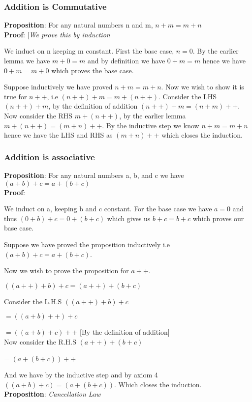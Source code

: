 \documentclass[10pt]{article}
\begin{document}
\subsubsection*{Addition is Commutative}
\textbf{Proposition}: For any natural numbers n and m, $ n + m = m + n $
\\[3pt]
\textbf{Proof}: [\emph{We prove this by induction}

  We induct on n keeping m constant. First the base case, $n = 0$. By the
  earlier lemma we have $m + 0 = m$ and by definition we have $0 + m =m$ hence
  we have $0 + m = m + 0$ which proves the base case.

  Suppose inductively we have proved $ n + m = m + n $. Now we wish to show it
  is true for $n++$, i.e $(n++) + m = m + (n++)$. Consider the LHS $(n++) + m$,
  by the definition of addition $(n++) + m = (n + m)++$. Now consider the RHS
  $m + (n++)$, by the earlier lemma $m + (n++) = (m + n)++$. By the inductive
  step we know $ n + m = m + n$ hence we have the LHS and RHS as $(m + n)++$
  which closes the induction.


\subsubsection*{Addition is associative}
\textbf{Proposition}: For any natural numbers a, b, and c we have $(a + b) + c =
a + (b + c)$
\\[3pt]
\textbf{Proof}:

We induct on a, keeping b and c constant. For the base case we have $a = 0$ and
thus $(0 + b) + c = 0 + (b + c)$ which gives us $b + c = b + c$ which proves our
base case.

Suppose we have proved the proposition inductively i.e $(a+b)+c = a+(b+c)$.

Now we wish to prove the proposition for $a++$.

$((a++)+b)+c = (a++) + (b + c)$

Consider the L.H.S $((a++)+b)+c$

$= ((a+b)++)+c$

$= ((a+b)+c)++$   [By the definition of addition]
\\[3pt]
Now consider the R.H.S $(a++)+(b+c)$

= $(a+(b+c))++$

And we have by the inductive step and by axiom 4 $((a+b)+c) = (a+(b+c))$. Which
closes the induction.
\\[6pt]
\textbf{Proposition}: \emph{Cancellation Law}
\end{document}
